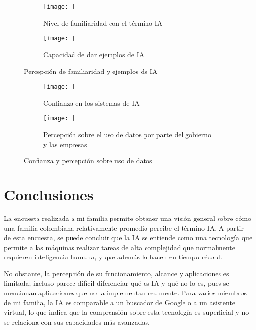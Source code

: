 \documentclass[12pt,a4paper]{article}
\begin{document}

\begin{figure}[h!]
    \centering
    \begin{subfigure}{0.45\linewidth}
        \centering
        \texttt{[image: ]}
        \caption{Nivel de familiaridad con el término IA}
        \label{fig:f3}
    \end{subfigure}
    \hfill
    \begin{subfigure}{0.45\linewidth}
        \centering
        \texttt{[image: ]}
        \caption{Capacidad de dar ejemplos de IA}
        \label{fig:f4}
    \end{subfigure}
    \caption{Percepción de familiaridad y ejemplos de IA}
\end{figure}

\begin{figure}[h!]
    \centering
    \begin{subfigure}{0.45\linewidth}
        \centering
        \texttt{[image: ]}
        \caption{Confianza en los sistemas de IA}
        \label{fig:f5}
    \end{subfigure}
    \hfill
    \begin{subfigure}{0.45\linewidth}
        \centering
        \texttt{[image: ]}
        \caption{Percepción sobre el uso de datos por parte del gobierno y las empresas}
        \label{fig:f6}
    \end{subfigure}
    \caption{Confianza y percepción sobre uso de datos}
\end{figure}

\section*{Conclusiones}
La encuesta realizada a mi familia permite obtener una visión general sobre cómo una familia colombiana
relativamente promedio percibe el término IA. A partir de esta encuesta, se puede concluir que la IA se entiende como 
una tecnología que permite a las máquinas realizar tareas de alta complejidad que normalmente requieren inteligencia humana,
y que además lo hacen en tiempo récord. 

No obstante, la percepción de su funcionamiento, alcance y aplicaciones es limitada; incluso parece difícil 
diferenciar qué es IA y qué no lo es, pues se mencionan aplicaciones que no la implementan realmente. 
Para varios miembros de mi familia, la IA es comparable a un buscador de Google o a un asistente virtual, 
lo que indica que la comprensión sobre esta tecnología es superficial y no se relaciona con sus capacidades más avanzadas.
\end{document}
